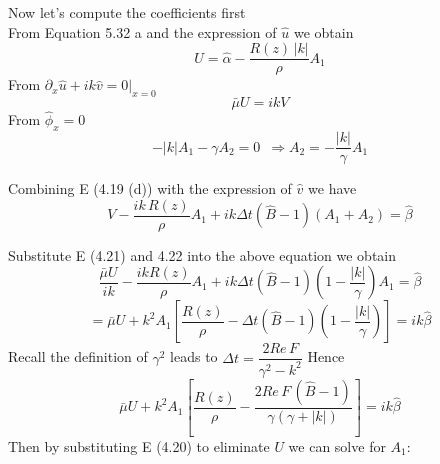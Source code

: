 Now let's compute the coefficients first\\
From Equation 5.32 a and the expression of $\hat{u}$ we obtain
\begin{equation}
U = \hat{\alpha} - \dfrac{R(z) \, |k|}{\rho} A_1
\end{equation}
From $\partial_x \hat{u} + ik \hat{v} = 0 |_{x = 0}$
\begin{equation}
\bar{\mu} U = ik V
\end{equation}
From $\hat{\phi}_x = 0$
\begin{equation}
-|k| A_1 - \gamma A_2 = 0 \, \, \, \Rightarrow A_2 = - \dfrac{|k|}{\gamma} A_1
\end{equation}

Combining E (4.19 (d)) with the expression of $\hat{v}$ we have
\begin{equation*}
V - \dfrac{ik \, R(z)}{\rho} A_1 + ik \Delta t (\hat{B} - 1) (A_1 + A_2) = \hat{\beta}
\end{equation*}

Substitute E (4.21) and 4.22 into the above equation we obtain
\begin{equation*}
\dfrac{\bar{\mu} U}{i k} - \dfrac{ik R(z)}{\rho} A_1 + ik \Delta t (\hat{B} - 1)(1 - \dfrac{|k|}{\gamma}) A_1 = \hat{\beta}
\end{equation*}
\begin{equation*}
= \bar{\mu} U + k^2 A_1[\dfrac{R(z)}{\rho} - \Delta t (\hat{B} - 1)(1 - \dfrac{|k|}{\gamma})] = ik \hat{\beta}
\end{equation*}
Recall the definition of $\gamma^2$ leads to $\Delta t = \dfrac{2 Re \, F}{\gamma^2 - k^2}$ Hence
\begin{equation}
\bar{\mu} U + k^2 A_1 [ \dfrac{R(z)}{\rho} - \dfrac{2 Re \, F \, (\hat{B} - 1)}{\gamma (\gamma + |k|)}] = ik \hat{\beta}
\end{equation}
Then by substituting E (4.20) to eliminate $U$ we can solve for $A_1$:

